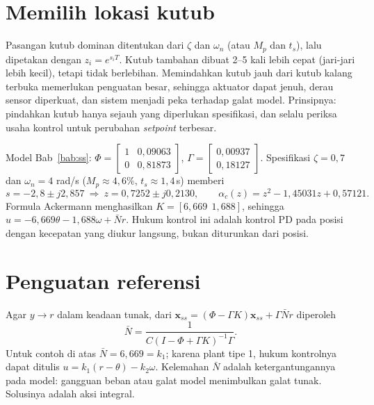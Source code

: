 \section{Memilih lokasi kutub}
Pasangan kutub dominan ditentukan dari $\zeta$ dan $\omega_n$ (atau $M_p$ dan $t_s$), lalu dipetakan dengan $z_i = e^{s_iT}$. Kutub tambahan dibuat 2--5 kali lebih cepat (jari-jari lebih kecil), tetapi tidak berlebihan. Memindahkan kutub jauh dari kutub kalang terbuka memerlukan penguatan besar, sehingga aktuator dapat jenuh, derau sensor diperkuat, dan sistem menjadi peka terhadap galat model. Prinsipnya: pindahkan kutub hanya sejauh yang diperlukan spesifikasi, dan selalu periksa usaha kontrol untuk perubahan \textit{setpoint} terbesar.

\begin{contoh}
	Model Bab~\ref{bab:ss}: $\Phi = \begin{bmatrix}1 & 0{,}09063\\ 0 & 0{,}81873\end{bmatrix}$, $\Gamma = \begin{bmatrix}0{,}00937\\ 0{,}18127\end{bmatrix}$. Spesifikasi $\zeta = 0{,}7$ dan $\omega_n = 4$ rad/s ($M_p \approx 4{,}6\%$, $t_s \approx 1{,}4$\,s) memberi
	\[
		s = -2{,}8 \pm j2{,}857\ \Rightarrow\ z = 0{,}7252 \pm j0{,}2130,\qquad \alpha_c(z) = z^2 - 1{,}45031z + 0{,}57121.
	\]
	Formula Ackermann menghasilkan $K = [6{,}669\ \ 1{,}688]$, sehingga $u = -6{,}669\theta - 1{,}688\omega + \bar Nr$. Hukum kontrol ini adalah kontrol PD pada posisi dengan kecepatan yang diukur langsung, bukan diturunkan dari posisi.
\end{contoh}

\section{Penguatan referensi}
Agar $y \to r$ dalam keadaan tunak, dari $\mathbf{x}_{ss} = (\Phi - \Gamma K)\mathbf{x}_{ss} + \Gamma\bar Nr$ diperoleh
\begin{equation}
	\bar N = \frac{1}{C(I - \Phi + \Gamma K)^{-1}\Gamma}.
\end{equation}
Untuk contoh di atas $\bar N = 6{,}669 = k_1$; karena plant tipe 1, hukum kontrolnya dapat ditulis $u = k_1(r - \theta) - k_2\omega$. Kelemahan $\bar N$ adalah ketergantungannya pada model: gangguan beban atau galat model menimbulkan galat tunak. Solusinya adalah aksi integral.

